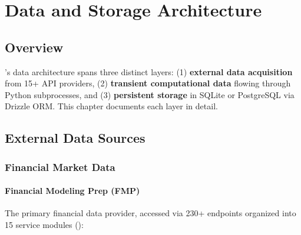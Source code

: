 \chapter{Data and Storage Architecture}
\label{ch:data-layer}

\section{Overview}
\label{sec:data:overview}

\autoscholar's data architecture spans three distinct layers: (1) \textbf{external data acquisition} from 15+ API providers, (2) \textbf{transient computational data} flowing through Python subprocesses, and (3) \textbf{persistent storage} in SQLite or PostgreSQL via Drizzle ORM.
This chapter documents each layer in detail.

\section{External Data Sources}
\label{sec:data:external}

\subsection{Financial Market Data}

\subsubsection{Financial Modeling Prep (FMP)}

The primary financial data provider, accessed via 230+ endpoints organized into 15 service modules ():

